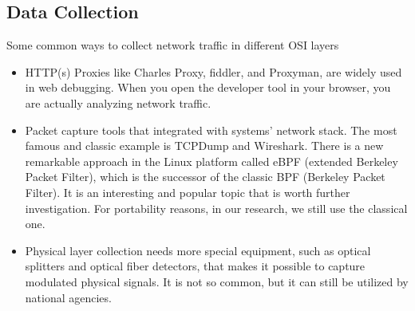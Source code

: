 \subsection{Data Collection}
\begin{frame}
Some common ways to collect network traffic in different OSI layers
\small
\begin{itemize}
    \item HTTP(s) Proxies like Charles Proxy, fiddler, and Proxyman, are widely used in web debugging. When you open the developer tool in your browser, you are actually analyzing network traffic. 
    \item Packet capture tools that integrated with systems' network stack. The most famous and classic example is TCPDump and Wireshark.
    There is a new remarkable approach in the Linux platform called eBPF (extended Berkeley Packet Filter), which is the successor of the classic BPF (Berkeley Packet Filter). It is an interesting and popular topic that is worth further investigation. For portability reasons, in our research, we still use the classical one. 
    \item Physical layer collection needs more special equipment, such as optical splitters and optical fiber detectors, that makes it possible to capture modulated physical signals. It is not so common, but it can still be utilized by national agencies.
\end{itemize}

\end{frame}



